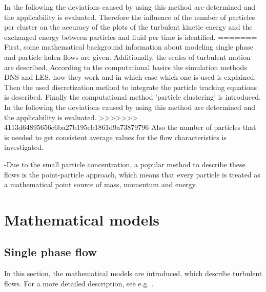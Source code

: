 \documentclass[11pt,a4paper,openany,oneside,parskip=half*]{article}
\begin{document}
In the following the deviations caused by using this method are determined and the applicability is evaluated. Therefore the influence of the number of particles per cluster on the accuracy of the plots of the turbulent kinetic energy and the exchanged energy between particles and fluid per time is identified.
=======
First, some mathematical background information about modeling single phase and particle laden flows are given. 
Additionally, the scales of turbulent motion are described.
According to the computational basics the simulation methods DNS and LES, how they work and in which case which one is used is explained.
Then the used discretization method to integrate the particle tracking equations is described.     
Finally the computational method 'particle clustering' is introduced. 
In the following the deviations caused by using this method are determined and the applicability is evaluated.
>>>>>>> 4113d64895656e6ba27b195eb1861d9a73879796
Also the number of particles that is needed to get consistent average values for the flow characteristics is investigated.

-Due to the small particle concentration, a popular method to describe these flows is the point-particle approach, which means that every particle is treated as a mathematical point source of mass, momentum and energy.
\pagebreak
\section{Mathematical models}%
\subsection{Single phase flow} %
In this section, the mathematical models are introduced, which describe turbulent flows. For a more detailed description, see e.g. \cite{turbulentFlows}.
\newline%
\end{document}
